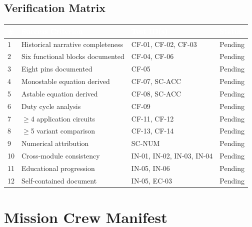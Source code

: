 \documentclass[11pt,letterpaper]{article}
\newcommand{\tableheader}[1]{\textbf{\sffamily\textcolor{white}{#1}}}
\begin{document}
\subsection{Verification Matrix}

\begin{center}
\begin{tabularx}{\textwidth}{C{0.5cm}XL{3cm}C{1.5cm}}
\toprule
{}
\tableheader{\#} & \tableheader{Success Criterion} & \tableheader{Test ID(s)} & \tableheader{Status} \\
 & Historical narrative completeness & CF-01, CF-02, CF-03 & Pending \\
2 & Six functional blocks documented & CF-04, CF-06 & Pending \\
3 & Eight pins documented & CF-05 & Pending \\
4 & Monostable equation derived & CF-07, SC-ACC & Pending \\
5 & Astable equation derived & CF-08, SC-ACC & Pending \\
6 & Duty cycle analysis & CF-09 & Pending \\
7 & $\geq$4 application circuits & CF-11, CF-12 & Pending \\
8 & $\geq$5 variant comparison & CF-13, CF-14 & Pending \\
9 & Numerical attribution & SC-NUM & Pending \\
10 & Cross-module consistency & IN-01, IN-02, IN-03, IN-04 & Pending \\
11 & Educational progression & IN-05, IN-06 & Pending \\
12 & Self-contained document & IN-05, EC-03 & Pending \\
\bottomrule
\end{tabularx}
\end{center}

\section{Mission Crew Manifest}
\end{document}
